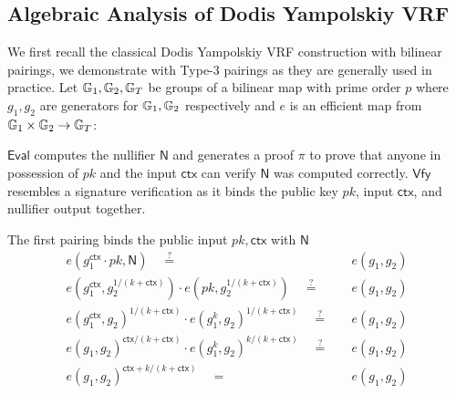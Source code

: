 \subsection{Algebraic Analysis of Dodis Yampolskiy VRF}
We first recall the classical Dodis Yampolskiy VRF construction with bilinear pairings, we demonstrate with Type-3 pairings as they are generally used in practice. Let $\mathbb{G}_1, \mathbb{G}_2, \mathbb{G}_T$ be groups of a bilinear map with prime order $p$ where $g_1, g_2$ are generators for $\mathbb{G}_1, \mathbb{G}_2$ respectively and $e$ is an efficient map from $\mathbb{G}_1 \times \mathbb{G}_2 \to \mathbb{G}_T$:


$$ computes the nullifier $\textsf{N}$ and generates a proof $\pi$ to prove that anyone in possession of $pk$ and the input $\textsf{ctx}$ can verify $\textsf{N}$ was computed correctly. $$ resembles a signature verification as it binds  the public key $pk$, input $\textsf{ctx}$, and nullifier output together. 

The first pairing binds the public input $pk, $ with $$
\begin{align*}
    e(g_1^\mathsf{ctx} \cdot pk, \mathsf{N})  \quad  \stackrel{?}{=}& \quad  e(g_1, g_2) \\
    e(g_1^\mathsf{ctx}, g_2^{1/(k + \mathsf{ctx})}) \cdot  e(pk, g_2^{1/(k + \mathsf{ctx})}) \quad  \stackrel{?}{=}& \quad  e(g_1, g_2) \\
    e(g_1^\mathsf{ctx}, g_2)^{1/(k + \mathsf{ctx})} \cdot  e(g_1^k, g_2)^{1/(k + \mathsf{ctx})} \quad  \stackrel{?}{=}& \quad  e(g_1, g_2) \\
    e(g_1, g_2)^{\mathsf{ctx}/(k + \mathsf{ctx})} \cdot  e(g_1^k, g_2)^{k/(k + \mathsf{ctx})} \quad  \stackrel{?}{=}& \quad  e(g_1, g_2) \\
    e(g_1, g_2)^{\mathsf{ctx} + k/(k + \mathsf{ctx})}  \quad =& \quad e(g_1, g_2) \\
\end{align*}

